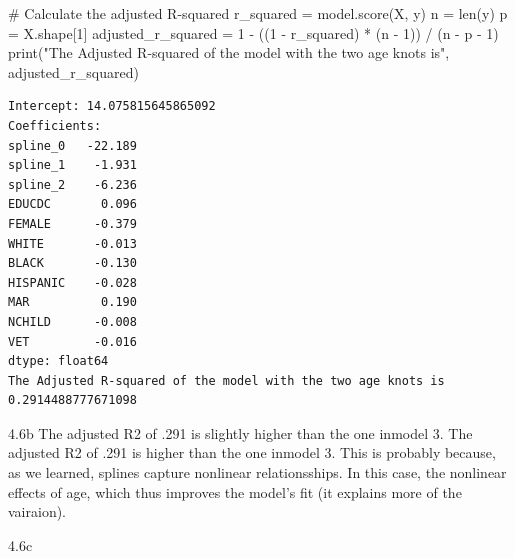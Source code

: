 \documentclass[
  11pt,
  letterpaper,
  DIV=11,
  numbers=noendperiod]{scrartcl}
\newenvironment{Shaded}{\begin{snugshade}}{\end{snugshade}}
\newcommand{\BuiltInTok}[1]{\textcolor[rgb]{0.00,0.23,0.31}{#1}}
\newcommand{\CommentTok}[1]{\textcolor[rgb]{0.37,0.37,0.37}{#1}}
\newcommand{\DecValTok}[1]{\textcolor[rgb]{0.68,0.00,0.00}{#1}}
\newcommand{\NormalTok}[1]{\textcolor[rgb]{0.00,0.23,0.31}{#1}}
\newcommand{\OperatorTok}[1]{\textcolor[rgb]{0.37,0.37,0.37}{#1}}
\newcommand{\StringTok}[1]{\textcolor[rgb]{0.13,0.47,0.30}{#1}}
\begin{document}
\begin{Shaded}
\begin{Highlighting}[]
\CommentTok{\# Calculate the adjusted R{-}squared}
\NormalTok{r\_squared }\OperatorTok{=}\NormalTok{ model.score(X, y)}
\NormalTok{n }\OperatorTok{=} \BuiltInTok{len}\NormalTok{(y)}
\NormalTok{p }\OperatorTok{=}\NormalTok{ X.shape[}\DecValTok{1}\NormalTok{]}
\NormalTok{adjusted\_r\_squared }\OperatorTok{=} \DecValTok{1} \OperatorTok{{-}}\NormalTok{ ((}\DecValTok{1} \OperatorTok{{-}}\NormalTok{ r\_squared) }\OperatorTok{*}\NormalTok{ (n }\OperatorTok{{-}} \DecValTok{1}\NormalTok{)) }\OperatorTok{/}\NormalTok{ (n }\OperatorTok{{-}}\NormalTok{ p }\OperatorTok{{-}} \DecValTok{1}\NormalTok{)}
\BuiltInTok{print}\NormalTok{(}\StringTok{"The Adjusted R{-}squared of the model with the two age knots is"}\NormalTok{, adjusted\_r\_squared)}
\end{Highlighting}
\end{Shaded}

\begin{verbatim}
Intercept: 14.075815645865092
Coefficients:
spline_0   -22.189
spline_1    -1.931
spline_2    -6.236
EDUCDC       0.096
FEMALE      -0.379
WHITE       -0.013
BLACK       -0.130
HISPANIC    -0.028
MAR          0.190
NCHILD      -0.008
VET         -0.016
dtype: float64
The Adjusted R-squared of the model with the two age knots is 0.2914488777671098
\end{verbatim}

4.6b The adjusted R2 of .291 is slightly higher than the one inmodel 3.
The adjusted R2 of .291 is higher than the one inmodel 3. This is
probably because, as we learned, splines capture nonlinear
relationsships. In this case, the nonlinear effects of age, which thus
improves the model's fit (it explains more of the vairaion).

4.6c
\end{document}
